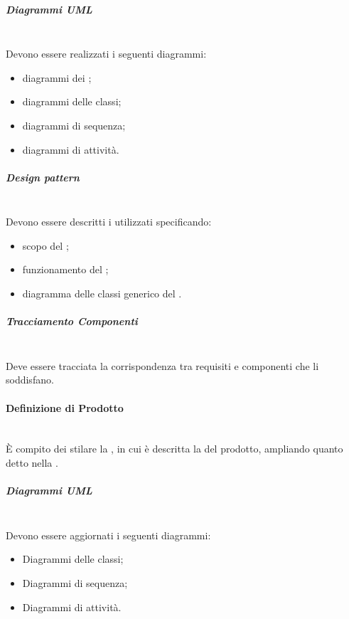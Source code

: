 \subparagraph{Diagrammi UML}\mbox{}\\
Devono essere realizzati i seguenti diagrammi:
\begin{itemize}
	\item diagrammi dei ;
	\item diagrammi delle classi;
	\item diagrammi di sequenza;
	\item diagrammi di attività.
\end{itemize}

\subparagraph{Design pattern}\mbox{}\\
Devono essere descritti i  utilizzati specificando:
\begin{itemize}
	\item scopo del ;
	\item funzionamento del ;
	\item diagramma delle classi generico del .
\end{itemize}

\subparagraph{Tracciamento Componenti}\mbox{}\\
Deve essere tracciata la corrispondenza tra requisiti e componenti che li soddisfano.

\paragraph{Definizione di Prodotto}\mbox{}\\
\`{E} compito dei \Progettisti{} stilare la \DefinizioneDiProdotto, in cui è descritta la \PD{} del prodotto, ampliando quanto detto nella \SpecificaTecnica.

\subparagraph{Diagrammi UML}\mbox{}\\
Devono essere aggiornati i seguenti diagrammi:
\begin{itemize}
	\item Diagrammi delle classi;
	\item Diagrammi di sequenza;
	\item Diagrammi di attività.
\end{itemize}

